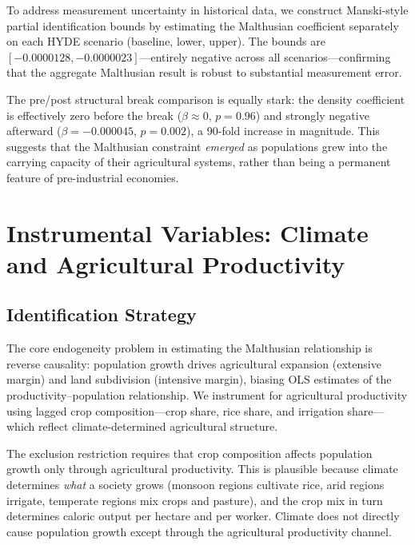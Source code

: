 \documentclass[12pt,letterpaper]{article}
\begin{document}
To address measurement uncertainty in historical data, we construct Manski-style partial identification bounds by estimating the Malthusian coefficient separately on each HYDE scenario (baseline, lower, upper). The bounds are $[-0.0000128, -0.0000023]$---entirely negative across all scenarios---confirming that the aggregate Malthusian result is robust to substantial measurement error.

The pre/post structural break comparison is equally stark: the density coefficient is effectively zero before the break ($\beta \approx 0$, $p = 0.96$) and strongly negative afterward ($\beta = -0.000045$, $p = 0.002$), a 90-fold increase in magnitude. This suggests that the Malthusian constraint \textit{emerged} as populations grew into the carrying capacity of their agricultural systems, rather than being a permanent feature of pre-industrial economies.

\section{Instrumental Variables: Climate and Agricultural Productivity}
\label{sec:iv}

\subsection{Identification Strategy}

The core endogeneity problem in estimating the Malthusian relationship is reverse causality: population growth drives agricultural expansion (extensive margin) and land subdivision (intensive margin), biasing OLS estimates of the productivity--population relationship. We instrument for agricultural productivity using lagged crop composition---crop share, rice share, and irrigation share---which reflect climate-determined agricultural structure.

The exclusion restriction requires that crop composition affects population growth only through agricultural productivity. This is plausible because climate determines \textit{what} a society grows (monsoon regions cultivate rice, arid regions irrigate, temperate regions mix crops and pasture), and the crop mix in turn determines caloric output per hectare and per worker. Climate does not directly cause population growth except through the agricultural productivity channel.
\end{document}
